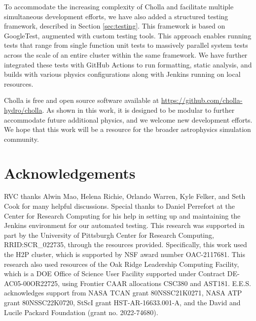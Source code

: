 \documentclass[modern, linenumbers]{aastex631}
\begin{document}
To accommodate the increasing complexity of Cholla and facilitate multiple simultaneous development efforts, we have also added a structured testing framework, described in Section \ref{sec:testing}. This framework is based on GoogleTest, augmented with custom testing tools. This approach enables running tests that range from single function unit tests to massively parallel system tests across the scale of an entire cluster within the same framework. We have further integrated these tests with GitHub Actions to run formatting, static analysis, and builds with various physics configurations along with Jenkins running on local resources.

Cholla is free and open source software available at \url{https://github.com/cholla-hydro/cholla}. As shown in this work, it is designed to be modular to further accommodate future additional physics, and we welcome new development efforts. We hope that this work will be a resource for the broader astrophysics simulation community.


\section{Acknowledgements}

RVC thanks Alwin Mao, Helena Richie, Orlando Warren, Kyle Felker, and Seth Cook for many helpful discussions. Special thanks to Daniel Perrefort at the Center for Research Computing for his help in setting up and maintaining the Jenkins environment for our automated testing. This research was supported in part by the University of Pittsburgh Center for Research Computing, RRID:SCR\_022735, through the resources provided. Specifically, this work used the H2P cluster, which is supported by NSF award number OAC-2117681. This research also used resources of the Oak Ridge Leadership Computing Facility, which is a DOE Office of Science User Facility supported under Contract DE-AC05-00OR22725, using Frontier CAAR allocations CSC380 and AST181. E.E.S. acknowledges support from NASA TCAN grant 80NSSC21K0271, NASA ATP grant 80NSSC22K0720, StScI grant HST-AR-16633.001-A, and the David and Lucile Packard Foundation (grant no. 2022-74680).



\end{document}
